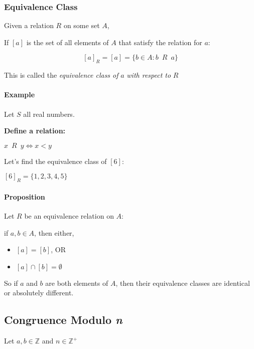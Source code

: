 \documentclass[
]{article}
\begin{document}
\hypertarget{header-n384}{%
\subsubsection{Equivalence Class }\label{header-n384}}

Given a relation \(R\) on some set \(A\),

If \([a]\) is the set of all elements of \(A\) that satisfy the relation
for \(a\):

\[[a]_R = [a] = \{b \in A : b\enspace R \enspace a\}\]

This is called the \emph{equivalence class of} \(a\) \emph{with respect
to} \(R\)

\hypertarget{header-n389}{%
\paragraph{Example}\label{header-n389}}

Let \(S\) all real numbers.

\textbf{Define a relation:}

\(x \enspace R \enspace y \iff x < y\)

Let's find the equivalence class of \([6]\):

\([6]_R = \{1,2,3,4,5\}\)

\hypertarget{header-n395}{%
\paragraph{Proposition}\label{header-n395}}

Let \(R\) be an equivalence relation on \(A\):

if \(a,b \in A\), then either,

\begin{itemize}
\item
  \([a] = [b]\), OR
\item
  \([a]\cap [b] = \emptyset\)
\end{itemize}

So if \(a\) and \(b\) are both elements of \(A\), then their equivalence
classes are identical or absolutely different.

\hypertarget{header-n405}{%
\subsection{\texorpdfstring{Congruence Modulo
\emph{n}}{Congruence Modulo n}}\label{header-n405}}

Let \(a, b \in \mathbb{Z}\) and \(n \in \mathbb{Z}^{+}\)
\end{document}
